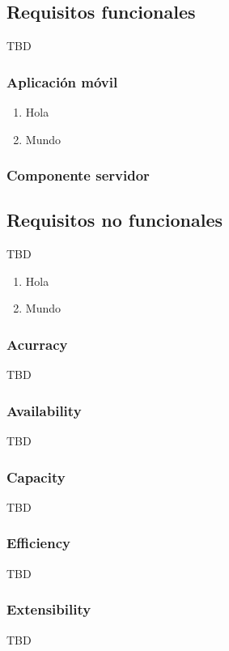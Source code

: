     \subsection{Requisitos funcionales}
        TBD

        \subsubsection{Aplicación móvil}

        \begin{enumerate}[label=\textbf{\texttt{RF-\arabic*}}]
            \item Hola
            \item Mundo
        \end{enumerate}

        \subsubsection{Componente servidor}
    
    \subsection{Requisitos no funcionales}
        TBD

        \begin{enumerate}[label=\textbf{\texttt{RNF-\arabic*}}]
            \item Hola
            \item Mundo
        \end{enumerate}

        \subsubsection{Acurracy}
            TBD
        \subsubsection{Availability}
            TBD
        \subsubsection{Capacity}
            TBD
        \subsubsection{Efficiency}
            TBD
        \subsubsection{Extensibility}
            TBD
